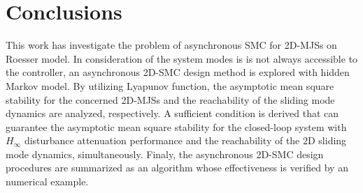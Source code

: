 \documentclass[conference]{IEEEtran}
\begin{document}
\section{Conclusions} \label{conclusion} 
This work has investigate the problem of asynchronous SMC for 2D-MJSs on Roesser model. In consideration of the system modes is is not always accessible to the controller, an asynchronous 2D-SMC design method is explored with hidden Markov model. By utilizing Lyapunov function, the asymptotic mean square stability for the concerned 2D-MJSs  and the reachability of the sliding mode dynamics are analyzed, respectively. A sufficient condition is derived that can guarantee the asymptotic mean square stability for the closed-loop system with $H_{\infty}$ disturbance attenuation  performance and the reachability of the 2D sliding mode dynamics, simultaneously. Finaly, the asynchronous 2D-SMC design procedures are summarized as an algorithm whose effectiveness is verified by an numerical example.

%
%
\end{document}

